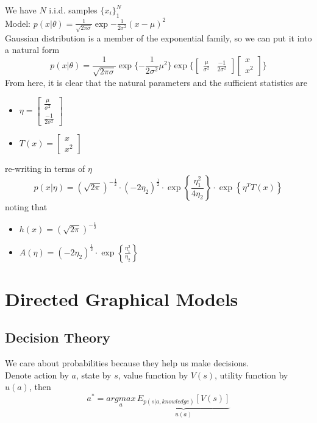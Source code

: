 \documentclass[11pt]{article}
\begin{document}
We have $N$ i.i.d. samples $\{x_i\}_1^N$\\
Model: $p(x|\theta) = \frac{1}{\sqrt{2\pi\sigma}}\exp{-\frac{1}{2\sigma^2}(x - \mu)^2}$\\
Gaussian distribution is a member of the exponential family, so we can put it into a natural form
$$p(x|\theta) = \frac{1}{\sqrt{2\pi\sigma}}\exp\{-\frac{1}{2\sigma^2}\mu^2\}\exp\{\begin{bmatrix}
	\frac{\mu}{\sigma^2} & \frac{-1}{2\sigma^2}\end{bmatrix}\begin{bmatrix}
	x \\ x^2
\end{bmatrix}\}$$
From here, it is clear that the natural parameters and the sufficient statistics are
\begin{itemize}
	\item $\eta = \begin{bmatrix}
		\frac{\mu}{\sigma^2} \\
		\frac{-1}{2\sigma^2}
	\end{bmatrix}$
	\item $T(x) = \begin{bmatrix}
		x \\ x^2
	\end{bmatrix}$
\end{itemize}
re-writing in terms of \(\eta\)
$$p(x | \eta)=(\sqrt{2 \pi})^{-\frac{1}{2}} \cdot\left(-2 \eta_{2}\right)^{\frac{1}{2}} \cdot \exp \left\{\frac{\eta_{1}^{2}}{4 \eta_{2}}\right\} \cdot \exp \left\{\eta^{T} T(x)\right\}$$
noting that\\
\begin{itemize}
	\item \(h(x)=(\sqrt{2 \pi})^{-\frac{1}{2}}\)
	\item \(A(\eta)=\left(-2 \eta_{2}\right)^{\frac{1}{2}} \cdot \exp \left\{\frac{\eta_{1}^{2}}{\eta_{2}}\right\}\)
\end{itemize}


\section{Directed Graphical Models}
\subsection{Decision Theory}
We care about probabilities because they help us make decisions.\\
Denote action by $a$, state by $s$, value function by $V(s)$, utility function by $u(a)$, then
$$a^* = \underset{a}{argmax}\, \underbrace{E_{p(s|a, knowledge)}[V(s)]}_{u(a)}$$
\end{document}
